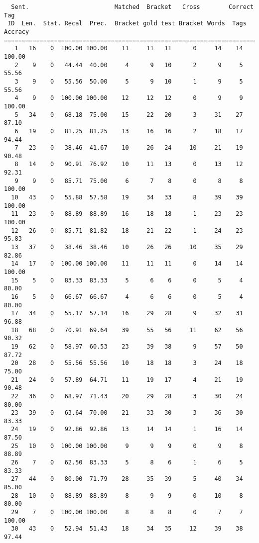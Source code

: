 \scriptsize
\begin{verbatim}
  Sent.                        Matched  Bracket   Cross        Correct Tag
 ID  Len.  Stat. Recal  Prec.  Bracket gold test Bracket Words  Tags Accracy
============================================================================
   1   16    0  100.00 100.00    11     11   11      0     14    14   100.00
   2    9    0   44.44  40.00     4      9   10      2      9     5    55.56
   3    9    0   55.56  50.00     5      9   10      1      9     5    55.56
   4    9    0  100.00 100.00    12     12   12      0      9     9   100.00
   5   34    0   68.18  75.00    15     22   20      3     31    27    87.10
   6   19    0   81.25  81.25    13     16   16      2     18    17    94.44
   7   23    0   38.46  41.67    10     26   24     10     21    19    90.48
   8   14    0   90.91  76.92    10     11   13      0     13    12    92.31
   9    9    0   85.71  75.00     6      7    8      0      8     8   100.00
  10   43    0   55.88  57.58    19     34   33      8     39    39   100.00
  11   23    0   88.89  88.89    16     18   18      1     23    23   100.00
  12   26    0   85.71  81.82    18     21   22      1     24    23    95.83
  13   37    0   38.46  38.46    10     26   26     10     35    29    82.86
  14   17    0  100.00 100.00    11     11   11      0     14    14   100.00
  15    5    0   83.33  83.33     5      6    6      0      5     4    80.00
  16    5    0   66.67  66.67     4      6    6      0      5     4    80.00
  17   34    0   55.17  57.14    16     29   28      9     32    31    96.88
  18   68    0   70.91  69.64    39     55   56     11     62    56    90.32
  19   62    0   58.97  60.53    23     39   38      9     57    50    87.72
  20   28    0   55.56  55.56    10     18   18      3     24    18    75.00
  21   24    0   57.89  64.71    11     19   17      4     21    19    90.48
  22   36    0   68.97  71.43    20     29   28      3     30    24    80.00
  23   39    0   63.64  70.00    21     33   30      3     36    30    83.33
  24   19    0   92.86  92.86    13     14   14      1     16    14    87.50
  25   10    0  100.00 100.00     9      9    9      0      9     8    88.89
  26    7    0   62.50  83.33     5      8    6      1      6     5    83.33
  27   44    0   80.00  71.79    28     35   39      5     40    34    85.00
  28   10    0   88.89  88.89     8      9    9      0     10     8    80.00
  29    7    0  100.00 100.00     8      8    8      0      7     7   100.00
  30   43    0   52.94  51.43    18     34   35     12     39    38    97.44

\end{verbatim}
